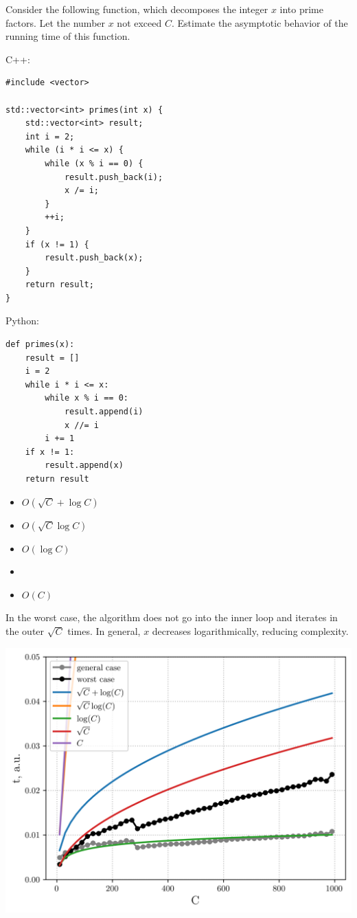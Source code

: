 \documentclass[a4paper]{article}
\begin{document}
Consider the following function, which decomposes the integer $x$ into prime factors. Let the number $x$ not exceed $C$. Estimate the asymptotic behavior of the running time of this function.

\SPACE

\noindent C++:

\begin{lstlisting}[style=C++]
#include <vector>

std::vector<int> primes(int x) {
    std::vector<int> result;
    int i = 2;
    while (i * i <= x) {
        while (x % i == 0) {
            result.push_back(i);
            x /= i;
        }
        ++i;
    }
    if (x != 1) {
        result.push_back(x);
    }
    return result;
}
\end{lstlisting}

\SPACE

\noindent Python:

\begin{lstlisting}[style=Python]
def primes(x):
    result = []
    i = 2
    while i * i <= x:
        while x % i == 0:
            result.append(i)
            x //= i
        i += 1
    if x != 1:
        result.append(x)
    return result
\end{lstlisting}

\SPACE

\LINE

\SPACE

\begin{itemize}
\item $O(\sqrt{C} + \log C)$
\item $O(\sqrt{C} \log C)$
\item $O(\log C)$
\item {}
\item $O(C)$
\end{itemize}

\SPACE

\newpage

In the worst case, the algorithm does not go into the inner loop and iterates in the outer $\sqrt{C}$ times. In general, $x$ decreases logarithmically, reducing complexity.

\begin{center}
\includegraphics[width=15cm]{06.png}
\end{center}
\end{document}
